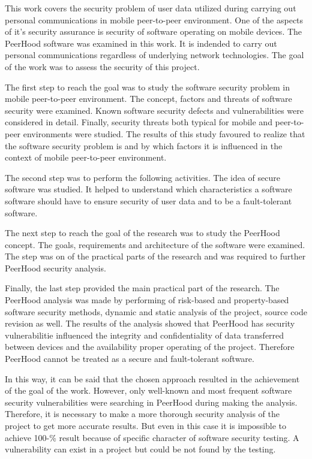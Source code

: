 %
%
This work covers the security problem of user data utilized during carrying out personal communications in mobile peer-to-peer environment. 
%
One of the aspects of it's security assurance is security of software operating on mobile devices. 
%
The PeerHood software was examined in this work. 
%
It is indended to carry out personal communications regardless of underlying network technologies. 
%
The goal of the work was to assess the security of this project. 

%
The first step to reach the goal was to study the software security problem in mobile peer-to-peer environment. 
%
The concept, factors and threats of software security were examined. 
%
Known software security defects and vulnerabilities were considered in detail. 
%
Finally, security threats both typical for mobile and peer-to-peer environments were studied. 
%
The results of this study favoured to realize that the software security problem is and by which factors it is influenced in the context of mobile peer-to-peer environment. 

%
The second step was to perform the following activities. 
%
The idea of secure software was studied. 
%
It helped to understand which characteristics a software software should have to ensure security of user data and to be a fault-tolerant software. 

%
The next step to reach the goal of the research was to study the PeerHood concept. 
%
The goals, requirements and architecture of the software were examined. 
%
The step was on of the practical parts of the research and was required to further PeerHood security analysis. 

%
Finally, the last step provided the main practical part of the research. 
%
The PeerHood analysis was made by performing of risk-based and property-based software security methods, dynamic and static analysis of the project, source code revision as well. 
%
The results of the analysis showed that PeerHood has security vulnerabilitie influenced the integrity and confidentiality of data transferred between devices and the availability proper operating of the project. 
%
Therefore PeerHood cannot be treated as a secure and fault-tolerant software. 

%
In this way, it can be said that the chosen approach resulted in the achievement of the goal of the work. 
%
However, only well-known and most frequent software security vulnerabilities were searching in PeerHood during making the analysis. 
%
Therefore, it is necessary to make a more thorough security analysis of the project to get more accurate results. 
%
But even in this case it is impossible to achieve 100-\% result because of specific character of software security testing. 
%
A vulnerability can exist in a project but could be not found by the testing. 

